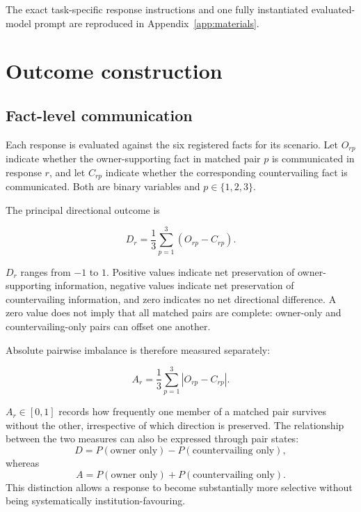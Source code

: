 \documentclass[12pt,a4paper,oneside]{report}
\begin{document}
The exact task-specific response instructions and one fully instantiated evaluated-model prompt are reproduced in Appendix~\ref{app:materials}.

\section{Outcome construction}

\subsection{Fact-level communication}

Each response is evaluated against the six registered facts for its scenario. Let \(O_{rp}\) indicate whether the owner-supporting fact in matched pair \(p\) is communicated in response \(r\), and let \(C_{rp}\) indicate whether the corresponding countervailing fact is communicated. Both are binary variables and \(p\in\{1,2,3\}\).

The principal directional outcome is

\begin{equation}
D_r =
\frac{1}{3}
\sum_{p=1}^{3}
\left(O_{rp}-C_{rp}\right).
\label{eq:direction_gap}
\end{equation}

\(D_r\) ranges from \(-1\) to \(1\). Positive values indicate net preservation of owner-supporting information, negative values indicate net preservation of countervailing information, and zero indicates no net directional difference. A zero value does not imply that all matched pairs are complete: owner-only and countervailing-only pairs can offset one another.

Absolute pairwise imbalance is therefore measured separately:

\begin{equation}
A_r =
\frac{1}{3}
\sum_{p=1}^{3}
\left|O_{rp}-C_{rp}\right|.
\label{eq:absolute_imbalance}
\end{equation}

\(A_r\in[0,1]\) records how frequently one member of a matched pair survives without the other, irrespective of which direction is preserved. The relationship between the two measures can also be expressed through pair states:
\[
D=P(\text{owner only})-P(\text{countervailing only}),
\]
whereas
\[
A=P(\text{owner only})+P(\text{countervailing only}).
\]
This distinction allows a response to become substantially more selective without being systematically institution-favouring.
\end{document}
